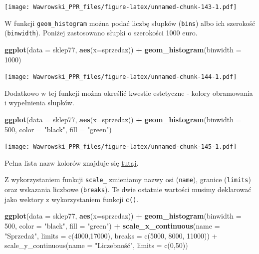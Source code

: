\documentclass[]{book}
\newenvironment{Shaded}{\begin{snugshade}}{\end{snugshade}}
\newcommand{\KeywordTok}[1]{\textcolor[rgb]{0.13,0.29,0.53}{\textbf{#1}}}
\newcommand{\DataTypeTok}[1]{\textcolor[rgb]{0.13,0.29,0.53}{#1}}
\newcommand{\DecValTok}[1]{\textcolor[rgb]{0.00,0.00,0.81}{#1}}
\newcommand{\StringTok}[1]{\textcolor[rgb]{0.31,0.60,0.02}{#1}}
\newcommand{\OperatorTok}[1]{\textcolor[rgb]{0.81,0.36,0.00}{\textbf{#1}}}
\newcommand{\NormalTok}[1]{#1}
\begin{document}
\texttt{[image: Wawrowski\_PPR\_files/figure-latex/unnamed-chunk-143-1.pdf]}

W funkcji \texttt{geom\_histogram} można podać liczbę słupków
(\texttt{bins}) albo ich szerokość (\texttt{binwidth}). Poniżej
zastosowano słupki o szerokości 1000 euro.

\begin{Shaded}
\begin{Highlighting}[]
\KeywordTok{ggplot}\NormalTok{(}\DataTypeTok{data =}\NormalTok{ sklep77, }\KeywordTok{aes}\NormalTok{(}\DataTypeTok{x=}\NormalTok{sprzedaz)) }\OperatorTok{+}
\StringTok{  }\KeywordTok{geom_histogram}\NormalTok{(}\DataTypeTok{binwidth =} \DecValTok{1000}\NormalTok{)}
\end{Highlighting}
\end{Shaded}

\texttt{[image: Wawrowski\_PPR\_files/figure-latex/unnamed-chunk-144-1.pdf]}

Dodatkowo w tej funkcji można określić kwestie estetyczne - kolory
obramowania i wypełnienia słupków.

\begin{Shaded}
\begin{Highlighting}[]
\KeywordTok{ggplot}\NormalTok{(}\DataTypeTok{data =}\NormalTok{ sklep77, }\KeywordTok{aes}\NormalTok{(}\DataTypeTok{x=}\NormalTok{sprzedaz)) }\OperatorTok{+}
\StringTok{  }\KeywordTok{geom_histogram}\NormalTok{(}\DataTypeTok{binwidth =} \DecValTok{500}\NormalTok{, }\DataTypeTok{color =} \StringTok{"black"}\NormalTok{, }\DataTypeTok{fill =} \StringTok{"green"}\NormalTok{)}
\end{Highlighting}
\end{Shaded}

\texttt{[image: Wawrowski\_PPR\_files/figure-latex/unnamed-chunk-145-1.pdf]}

Pełna lista nazw kolorów znajduje się
\href{http://www.stat.columbia.edu/~tzheng/files/Rcolor.pdf}{tutaj}.

Z wykorzystaniem funkcji \texttt{scale\_} zmieniamy nazwy osi
(\texttt{name}), granice (\texttt{limits}) oraz wskazania liczbowe
(\texttt{breaks}). Te dwie ostatnie wartości musimy deklarować jako
wektory z wykorzystaniem funkcji \texttt{c()}.

\begin{Shaded}
\begin{Highlighting}[]
\KeywordTok{ggplot}\NormalTok{(}\DataTypeTok{data =}\NormalTok{ sklep77, }\KeywordTok{aes}\NormalTok{(}\DataTypeTok{x=}\NormalTok{sprzedaz)) }\OperatorTok{+}
\StringTok{  }\KeywordTok{geom_histogram}\NormalTok{(}\DataTypeTok{binwidth =} \DecValTok{500}\NormalTok{, }
                 \DataTypeTok{color =} \StringTok{"black"}\NormalTok{, }\DataTypeTok{fill =} \StringTok{"green"}\NormalTok{) }\OperatorTok{+}
\StringTok{  }\KeywordTok{scale_x_continuous}\NormalTok{(}\DataTypeTok{name =} \StringTok{"Sprzedaż", }
\StringTok{                     limits = c(4000,17000),}
\StringTok{                     breaks = c(5000, 8000, 11000)) +}
\StringTok{  scale_y_continuous(name = "}\NormalTok{Liczebność}\StringTok{",}
\StringTok{                     limits = c(0,50))}
\end{Highlighting}
\end{Shaded}
\end{document}
